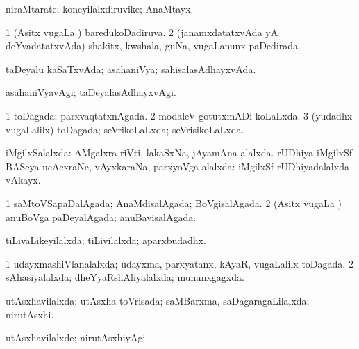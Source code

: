 \bentry
{} 
\gl{\nA}
\expl{}
\bmng
 niraMtarate; koneyilalxdiruvike; AnaMtayx. 
\emng
\eentry

\bentry
{} 
\gl{\gu}
\expl{}
\bmng
\bnum
\num{1} (Asitx \mo vugaLa \vi) baredukoDadiruva. 
\num{2} (janamxdatatxvAda yA deYvadatatxvAda) shakitx, kwshala, guNa, \mo vugaLanunx paDedirada. 
\enum
\emng
\eentry

\bentry
{} 
\gl{\gu}
\expl{}
\bmng
taDeyalu kaSaTxvAda; asahaniVya; sahisalasAdhayxvAda. 
\emng
\eentry

\bentry
{} 
\gl{\kirxvi}
\expl{}
\bmng
asahaniVyavAgi; taDeyalasAdhayxvAgi. 
\emng
\eentry

\bentry
{} 
\gl{\gu}
\expl{}
\bmng
\bnum
\num{1} toDagada; parxvaqtatxnAgada. 
\num{2} modaleV gotutxmADi koLaLxda. 
\num{3} (yudadhx \mo vugaLalilx) toDagada; seVrikoLaLxda; seVrisikoLaLxda. 
\enum
\emng
\eentry

\bentry
{} 
\gl{\gu}
\expl{}
\bmng
 iMgilxSalalxda: 
\banum
{} AMgalxra riVti, lakaSxNa, jAyamAna alalxda. 
 rUDhiya iMgilxSf BASeya ucAcxraNe, vAyxkaraNa, parxyoVga alalxda:  iMgilxSf rUDhiyadalalxda vAkayx. 
\eanum
\emng
\eentry

\bentry
{} 
\gl{\gu}
\expl{}
\bmng
\bnum
\num{1} saMtoVSapaDalAgada; AnaMdisalAgada; BoVgisalAgada. 
\num{2} (Asitx \mo vugaLa \vi) anuBoVga paDeyalAgada; anuBavisalAgada. 
\enum
\emng
\eentry

\bentry
{} 
\gl{\gu}
\expl{}
\bmng
 tiLivaLikeyilalxda; tiLivilalxda; aparxbudadhx. 
\emng
\eentry

\bentry
{} 
\gl{\gu}
\expl{}
\bmng
\bnum
\num{1} udayxmashiVlanalalxda; udayxma, parxyatanx, kAyaR, \mo vugaLalilx toDagada. 
\num{2} sAhasiyalalxda; dheYyaRshAliyalalxda; mununxgagxda. 
\enum
\emng
\eentry

\bentry
{} 
\gl{\gu}
\expl{}
\bmng
 utAsxhavilalxda; utAsxha toVrisada; saMBarxma, saDagaragaLilalxda; nirutAsxhi. 
\emng
\eentry

\bentry
{} 
\gl{\kirxvi}
\expl{}
\bmng
utAsxhavilalxde; nirutAsxhiyAgi. 
\emng
\eentry

